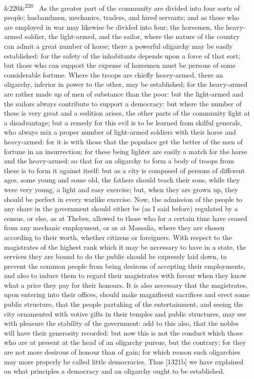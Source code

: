 \documentclass[12pt]{article}
\newcommand{\para}[1][]{\par\noindent\ifx&#1&\else\textsuperscript{\footnotesize #1}~\fi}
\begin{document}
\para[220] As the greater part of the community are divided into four sorts of people; husbandmen, mechanics, traders, and hired servants; and as those who are employed in war may likewise be divided into four; the horsemen, the heavy-armed soldier, the light-armed, and the sailor, where the nature of the country can admit a great number of horse; there a powerful oligarchy may be easily established: for the safety of the inhabitants depends upon a force of that sort; but those who can support the expense of horsemen must be persons of some considerable fortune. Where the troops are chiefly heavy-armed, there an oligarchy, inferior in power to the other, may be established; for the heavy-armed are rather made up of men of substance than the poor: but the light-armed and the sailors always contribute to support a democracy: but where the number of these is very great and a sedition arises, the other parts of the community fight at a disadvantage; but a remedy for this evil is to be learned from skilful generals, who always mix a proper number of light-armed soldiers with their horse and heavy-armed: for it is with those that the populace get the better of the men of fortune in an insurrection; for these being lighter are easily a match for the horse and the heavy-armed: so that for an oligarchy to form a body of troops from these is to form it against itself: but as a city is composed of persons of different ages, some young and some old, the fathers should teach their sons, while they were very young, a light and easy exercise; but, when they are grown up, they should be perfect in every warlike exercise. Now, the admission of the people to any share in the government should either be (as I said before) regulated by a census, or else, as at Thebes, allowed to those who for a certain time have ceased from any mechanic employment, or as at Massalia, where they are chosen according to their worth, whether citizens or foreigners. With respect to the magistrates of the highest rank which it may be necessary to have in a state, the services they are bound to do the public should be expressly laid down, to prevent the common people from being desirous of accepting their employments, and also to induce them to regard their magistrates with favour when they know what a price they pay for their honours. It is also necessary that the magistrates, upon entering into their offices, should make magnificent sacrifices and erect some public structure, that the people partaking of the entertainment, and seeing the city ornamented with votive gifts in their temples and public structures, may see with pleasure the stability of the government: add to this also, that the nobles will have their generosity recorded: but now this is not the conduct which those who are at present at the head of an oligarchy pursue, but the contrary; for they are not more desirous of honour than of gain; for which reason such oligarchies may more properly be called little democracies. Thus [1321b] we have explained on what principles a democracy and an oligarchy ought to be established.
\end{document}
